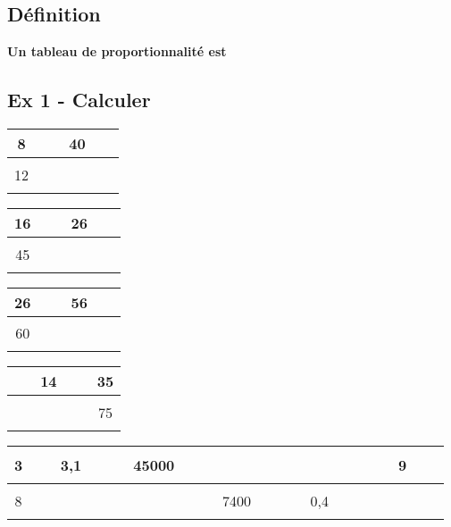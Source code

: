 \subsection*{Définition}

\textbf{Un tableau de proportionnalité est}\dotfill \\ \Pointilles[3] 

\subsection*{Ex 1 - Calculer}


\begin{multicols}{4}\noindent
  \begin{center} \begin{tabular}{|c|c|}  \hline
      8    & 40\\  \hline
      12 & $\phantom{\dfrac{azertyuiop}{O}}$\\  \hline
    \end{tabular} \end{center}
  \Pointilles[2]
  \begin{center} \begin{tabular}{|c|c|}   \hline
      16  & 26\\  \hline
      45 & $\phantom{\dfrac{azertyuiop}{O}}$\\  \hline
    \end{tabular} \end{center}
  \Pointilles[2]
  \begin{center} \begin{tabular}{|c|c|}   \hline
      26  & 56\\  \hline
      60 & $\phantom{\dfrac{azertyuiop}{O}}$\\  \hline
    \end{tabular} \end{center}
  \Pointilles[2]
  \begin{center}\begin{tabular}{|c|c|}  \hline
      14 & 35\\  \hline
      $\phantom{\dfrac{azertyuiop}{O}}$ & 75\\  \hline
    \end{tabular} \end{center}

  \Pointilles[2]

\end{multicols}

\begin{center} \begin{tabular}{|c|c|c|c|c|c|} \hline
   3 &  3,1                   &                  45000 &  $\phantom{\dfrac{azertyuiop}{O}}$ & $\phantom{\dfrac{azertyuiop}{O}}$&                     9\\ \hline
   8 &  $\phantom{\dfrac{azertyuiop}{O}}$ & $\phantom{\dfrac{azertyuiop}{O}}$ &                   7400 &                    0,4 &  $\phantom{\dfrac{azertyuiop}{O}}$\\ \hline     
  \end{tabular}\end{center}

